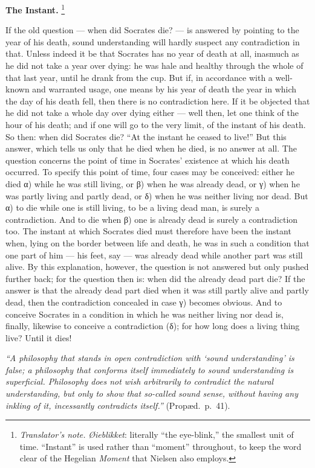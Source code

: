 \documentclass[12pt,a4paper]{book}
\renewcommand{\thefootnote}{\ifcase\value{footnote}\or *)\or **)\or ***)\fi}
\newcommand{\tnote}[1]{%
  \begingroup
  \renewcommand{\thefootnote}{\textdagger}%
  \footnote{\emph{Translator's note.} #1}%
  \addtocounter{footnote}{-1}%
  \endgroup}
\begin{document}
\textbf{The Instant.}\tnote{\emph{Øieblikket}: literally ``the eye-blink,'' the
smallest unit of time. ``Instant'' is used rather than ``moment'' throughout,
to keep the word clear of the Hegelian \emph{Moment} that Nielsen also
employs.} If the old question --- when did Socrates die? --- is answered by
pointing to the year of his death, sound understanding will hardly suspect any
contradiction in that. Unless indeed it be that Socrates has no year of death
at all, inasmuch as he did not take a year over dying: he was hale and healthy
through the whole of that last year, until he drank from the cup. But if, in
accordance with a well-known and warranted usage, one means by his year of
death the year in which the day of his
death fell, then there is no contradiction here. If it be objected that he did
not take a whole day over dying either --- well then, let one think of the hour
of his death; and if one will go to the very limit, of the instant of his
death. So then: when did Socrates die? ``At the instant he ceased to live!''
But this answer, which tells us only that he died when he died, is no answer at
all. The question concerns the point of time in Socrates' existence at which
his death occurred. To specify this point of time, four cases may be conceived:
either he died α) while he was still living, or β) when he was already dead, or
γ) when he was partly living and partly dead, or δ) when he was neither living
nor dead. But α) to die while one is still living, to be a living dead man, is
surely a contradiction. And to die when β) one is already dead is surely a
contradiction too. The instant at which Socrates died must therefore have been
the instant when, lying on the border between life and death, he was in such a
condition that one part of him --- his feet, say --- was already dead while
another part was still alive. By this explanation, however, the question is not
answered but only pushed further back; for the question then is: when did the
already dead part die? If the answer is that the already dead part died when it
was still partly alive and partly dead, then the contradiction concealed in
case γ) becomes obvious. And to conceive Socrates in a condition in which he
was neither living nor dead is, finally, likewise to conceive a contradiction
(δ); for how long does a living thing live? Until it dies!

\emph{``A philosophy that stands in open contradiction with `sound
understanding' is false; a philosophy that conforms itself immediately to sound
understanding is superficial. Philosophy does not wish arbitrarily to
contradict the natural understanding, but only to show that so-called sound
sense, without having
any inkling of it, incessantly contradicts itself.''} (Propæd.\ p.~41).
\end{document}
